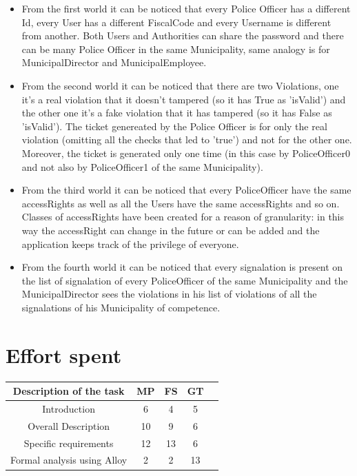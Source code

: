 \documentclass{article}
\begin{document}
\begin{itemize}
    \item From the first world it can be noticed that every Police Officer has
a different Id, every User has a different FiscalCode and every Username is
different from another. Both Users and Authorities can share the password and
there can be many Police Officer in the same Municipality, same analogy is for
MunicipalDirector and MunicipalEmployee.

    \item From the second world it can be noticed that there are two
Violations, one it's a real violation that it doesn't tampered (so it has True
as 'isValid') and the other one it's a fake violation that it has tampered (so
it has False as 'isValid'). The ticket genereated by the Police Officer is for
only the real violation (omitting all the checks that led to 'true') and not for
the other one. Moreover, the ticket is generated only one time (in this case by
PoliceOfficer0 and not also by PoliceOfficer1 of the same Municipality).

    \item From the third world it can be noticed that every PoliceOfficer have
the same accessRights as well as all the Users have the same accessRights and so
on. Classes of accessRights have been created for a reason of granularity: in
this way the accessRight can change in the future or can be added and the
application keeps track of the privilege of everyone.

    \item From the fourth world it can be noticed that every signalation is
present on the list of signalation of every PoliceOfficer of the same
Municipality and the MunicipalDirector sees the violations in his list of
violations of all the signalations of his Municipality of competence.
\end{itemize}

\newpage
\section{Effort spent}
\begin{center}
    \begin{tabular}{|c|c|c|c|c|}
        \hline
        \textbf{Description of the task} & \textbf{MP} & \textbf{FS} &
        \textbf{GT} \\
        \hline
        Introduction                    & 6   & 4     & 5     \\
        Overall Description             & 10  & 9     & 6     \\
        Specific requirements           & 12  & 13    & 6     \\
        Formal analysis using Alloy     & 2   & 2     & 13    \\
        \hline
    \end{tabular}
\end{center}

    
\end{document}
